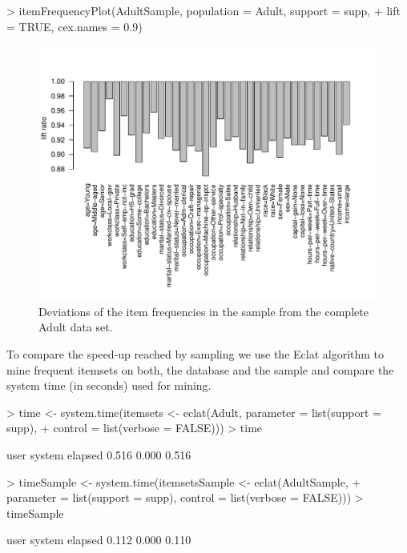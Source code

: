 \documentclass[10pt,a4paper]{article}
\begin{document}
\begin{Schunk}
\begin{Sinput}
> itemFrequencyPlot(AdultSample, population = Adult, support = supp, 
+     lift = TRUE, cex.names = 0.9)
\end{Sinput}
\end{Schunk}
\begin{figure}
\centering
\includegraphics{arules-035}
\caption{Deviations of the item frequencies in the sample from 
the complete Adult data set.}
\label{fig:itemFrequencyPlot3}
\end{figure}

To compare the speed-up reached by sampling we use the Eclat algorithm
to mine frequent itemsets on both, the database and the sample
and compare the system time (in seconds) used for mining.

\begin{Schunk}
\begin{Sinput}
> time <- system.time(itemsets <- eclat(Adult, parameter = list(support = supp), 
+     control = list(verbose = FALSE)))
> time
\end{Sinput}
\begin{Soutput}
   user  system elapsed 
  0.516   0.000   0.516 
\end{Soutput}
\begin{Sinput}
> timeSample <- system.time(itemsetsSample <- eclat(AdultSample, 
+     parameter = list(support = supp), control = list(verbose = FALSE)))
> timeSample
\end{Sinput}
\begin{Soutput}
   user  system elapsed 
  0.112   0.000   0.110 
\end{Soutput}
\end{Schunk}
\end{document}
